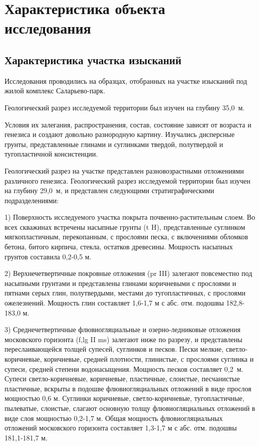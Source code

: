 \chapter{Характеристика объекта исследования}
\section{Характеристика участка изысканий}
Исследования проводились на образцах, отобранных на участке изысканий под жилой комплекс Саларьево-парк.

Геологический разрез исследуемой территории был изучен на глубину 35,0~м.

Условия их залегания, распространения, состав, состояние зависят от возраста и генезиса и создают довольно разнородную картину. Изучались дисперсные грунты, представленные глинами и суглинками твердой, полутвердой и тугопластичной консистенции.


Геологический разрез на участке представлен разновозрастными отложениями различного генезиса.
Геологический разрез исследуемой территории был изучен на глубину 29,0~м, и представлен следующими стратиграфическими подразделениями:

1) Поверхность исследуемого участка покрыта почвенно-растительным слоем. Во всех скважинах встречены насыпные грунты (t H), представленные суглинком мягкопластичным, перекопанным, с прослоями песка, с включениями обломков бетона, битого кирпича, стекла, остатков древесины. Мощность насыпных грунтов составила 0,2-0,5 м.

2) Верхнечетвертичные покровные отложения (pr III) залегают повсеместно под насыпными грунтами и представлены глинами коричневыми с прослоями и пятнами серых глин, полутвердыми, местами до тугопластичных, с прослоями ожелезнений. Мощность глин составляет 1,6-1,7 м с абс. отм. подошвы 182,8-183,0 м.

3) Среднечетвертичные флювиогляциальные и озерно-ледниковые отложения московского горизонта (f,lg II ms) залегают ниже по разрезу, и представлены переслаивающейся толщей супесей, суглинков и песков. Пески мелкие, светло-коричневые, коричневые, средней плотности, глинистые, с прослоями суглинка и супеси, средней степени водонасыщения. Мощность песков составляет 0,2~м. Супеси светло-коричневые, коричневые, пластичные, слоистые, песчанистые пластичные, вскрыты в подошве флювиогляциальных отложений в виде прослоя мощностью 0,6 м. Суглинки коричневые, светло-коричневые, тугопластичные, пылеватые, слоистые, слагают основную толщу флювиогляциальных отложений в виде слоя мощностью 0,2-1,7 м. Общая мощность флювиогляциальных отложений московского горизонта составляет 1,3-1,7 м с абс. отм. подошвы 181,1-181,7 м.


